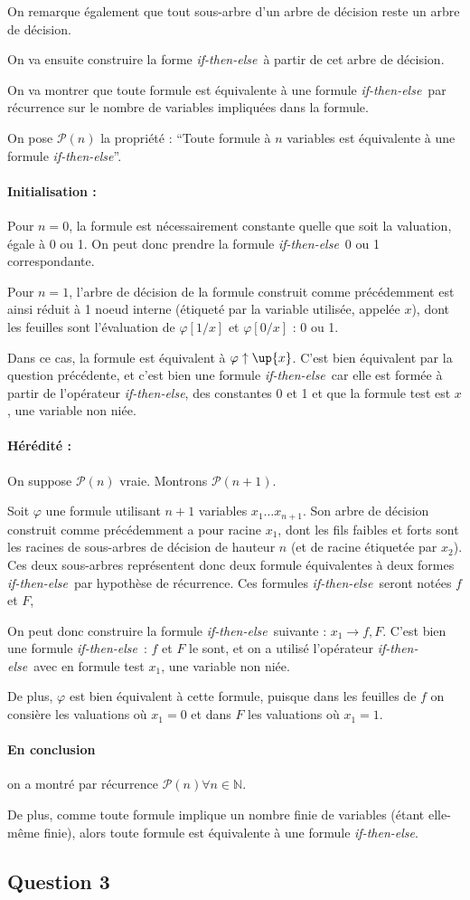 \documentclass[12pt]{article}
\def\question#1{\subsection*{Question #1}}
\def\phix{\varphi\uparrow\up{x}}
\def\ite{\textit{if-then-else}}
\def\P{\mathcal{P}}
\begin{document}
On remarque également que tout sous-arbre d'un arbre de décision reste un arbre de décision. %

On va ensuite construire la forme \ite\ à partir de cet arbre de décision.

On va montrer que toute formule est équivalente à une formule \ite\ par récurrence sur le nombre de variables impliquées dans la formule.

On pose $\P(n)$ la propriété : ``Toute formule à $n$ variables est équivalente à une formule \ite''.

\paragraph{Initialisation : } 
Pour $n=0$, la formule est nécessairement constante quelle que soit la valuation, égale à 0 ou 1. On peut donc prendre la formule \ite\ 0 ou 1 correspondante.

Pour $n=1$, l'arbre de décision de la formule construit comme précédemment est ainsi réduit à 1 noeud interne (étiqueté par la variable utilisée, appelée $x$), dont les feuilles sont l'évaluation de $\varphi [ 1/x ]$ et $\varphi [ 0/x ]$ : 0 ou 1.

Dans ce cas, la formule est équivalent à $\phix$. C'est bien équivalent par la question précédente, et c'est bien une formule \ite\ car elle est formée à partir de l'opérateur \ite, des constantes 0 et 1 et que la formule test est $x$, une variable non niée.

\paragraph{Hérédité : }
On suppose $\P (n)$ vraie. Montrons $\P (n+1)$.

Soit $\varphi$ une formule utilisant $n+1$ variables $x_1\dots x_{n+1}$. Son arbre de décision construit comme précédemment a pour racine $x_1$, dont les fils faibles et forts sont les racines de sous-arbres de décision de hauteur $n$ (et de racine étiquetée par $x_2$). Ces deux sous-arbres représentent donc deux formule équivalentes à deux formes \ite\ par hypothèse de récurrence. Ces formules \ite\ seront notées $f$ et $F$,

On peut donc construire la formule \ite\ suivante : $x_1\rightarrow f,F$. C'est bien une formule \ite\ : $f$ et $F$ le sont, et on a utilisé l'opérateur \ite\ avec en formule test $x_1$, une variable non niée.

De plus, $\varphi$ est bien équivalent à cette formule, puisque dans les feuilles de $f$ on consière les valuations où $x_1 = 0$ et dans $F$ les valuations où $x_1 = 1$.


\paragraph{En conclusion} on a montré par récurrence $\P (n)\forall n\in\mathbb{N}$.

De plus, comme toute formule implique un nombre finie de variables (étant elle-même finie), alors toute formule est équivalente à une formule \ite.

\question{3}
\end{document}
